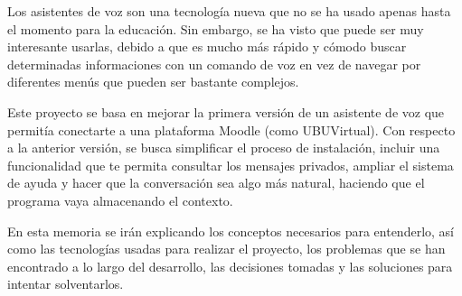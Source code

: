 
Los asistentes de voz son una tecnología nueva que no se ha usado apenas hasta el momento para la educación. Sin embargo, se ha visto que puede ser muy interesante usarlas, debido a que es mucho más rápido y cómodo buscar determinadas informaciones con un comando de voz en vez de navegar por diferentes menús que pueden ser bastante complejos.

Este proyecto se basa en mejorar la primera versión de un asistente de voz que permitía conectarte a una plataforma Moodle (como UBUVirtual). Con respecto a la anterior versión, se busca simplificar el proceso de instalación, incluir una funcionalidad que te permita consultar los mensajes privados, ampliar el sistema de ayuda y hacer que la conversación sea algo más natural, haciendo que el programa vaya almacenando el contexto.

En esta memoria se irán explicando los conceptos necesarios para entenderlo, así como las tecnologías usadas para realizar el proyecto, los problemas que se han encontrado a lo largo del desarrollo, las decisiones tomadas y las soluciones para intentar solventarlos.
